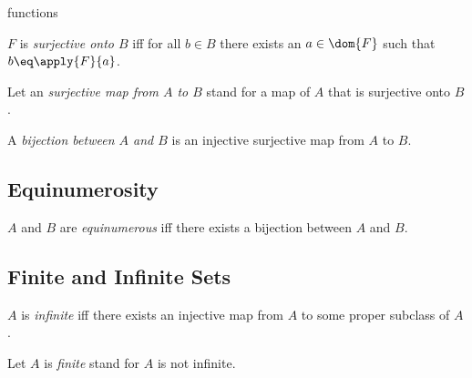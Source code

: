 \documentclass{naproche-library}
\begin{document}
\begin{smodule}{functions}
\begin{definition*}[forthel,id=SurjectionDef,printid]
  $F$ is \emph{surjective onto $B$} iff for all $b\in B$ there exists an $a\in\dom{F}$ such that $b\eq \apply{F}{a}$.

  Let an \emph{surjective map from $A$ to $B$} stand for a map of $A$ that is surjective onto $B$.
\end{definition*}

\begin{definition*}[forthel,id=BijectionDef,printid]
  A \emph{bijection between $A$ and $B$} is an injective surjective map from $A$ to $B$.
\end{definition*}

\subsection{Equinumerosity}

\begin{definition*}[forthel,id=EquinumerousDef,printid]
  $A$ and $B$ are \emph{equinumerous} iff there exists a bijection between $A$ and $B$.
\end{definition*}


\subsection{Finite and Infinite Sets}

\begin{definition*}[forthel,id=InfiniteDef,printid]
  $A$ is \emph{infinite} iff there exists an injective map from $A$ to some proper subclass of $A$.

  Let $A$ is \emph{finite} stand for $A$ is not infinite.
\end{definition*}
\end{smodule}
\end{document}
